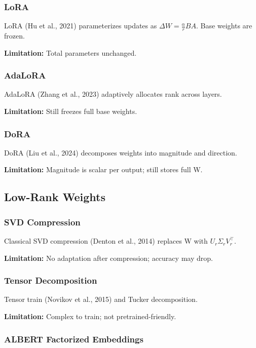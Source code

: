 \subsubsection{LoRA}

LoRA (Hu et al., 2021) parameterizes updates as $\Delta W = \frac{\alpha}{r} BA$. 
Base weights are frozen.

\textbf{Limitation:} Total parameters unchanged.

\subsubsection{AdaLoRA}

AdaLoRA (Zhang et al., 2023) adaptively allocates rank across layers.

\textbf{Limitation:} Still freezes full base weights.

\subsubsection{DoRA}

DoRA (Liu et al., 2024) decomposes weights into magnitude and direction.

\textbf{Limitation:} Magnitude is scalar per output; still stores full W.

\subsection{Low-Rank Weights}

\subsubsection{SVD Compression}

Classical SVD compression (Denton et al., 2014) replaces W with $U_r \Sigma_r V_r^\top$.

\textbf{Limitation:} No adaptation after compression; accuracy may drop.

\subsubsection{Tensor Decomposition}

Tensor train (Novikov et al., 2015) and Tucker decomposition.

\textbf{Limitation:} Complex to train; not pretrained-friendly.

\subsubsection{ALBERT Factorized Embeddings}

